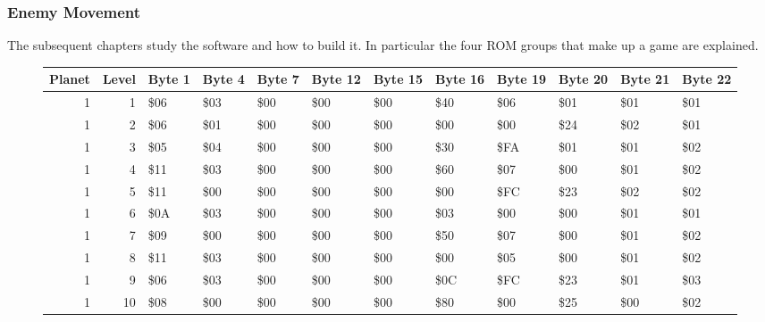 {\subsubsection{Enemy Movement}
The subsequent chapters study the software and how to build it. In particular the four ROM groups that make up a game are explained. 
\begin{figure}[H]
{ 
\setlength{\tabcolsep}{3.0pt}
\setlength\cmidrulewidth{\heavyrulewidth} %
\begin{adjustbox}{width=\textwidth}
\begin{tabular}{rrllllllllll}
\hline
   Planet &   Level & Byte 1    & Byte 4    & Byte 7    & Byte 12   & Byte 15   & Byte 16   & Byte 19   & Byte 20   & Byte 21   & Byte 22   \\
\hline
        1 &       1 & \$06       & \$03       & \$00       & \$00       & \$00       & \$40       & \$06       & \$01       & \$01       & \$01       \\
        1 &       2 & \$06       & \$01       & \$00       & \$00       & \$00       & \$00       & \$00       & \$24       & \$02       & \$01       \\
        1 &       3 & \$05       & \$04       & \$00       & \$00       & \$00       & \$30       & \$FA       & \$01       & \$01       & \$02       \\
        1 &       4 & \$11       & \$03       & \$00       & \$00       & \$00       & \$60       & \$07       & \$00       & \$01       & \$02       \\
        1 &       5 & \$11       & \$00       & \$00       & \$00       & \$00       & \$00       & \$FC       & \$23       & \$02       & \$02       \\
        1 &       6 & \$0A       & \$03       & \$00       & \$00       & \$00       & \$03       & \$00       & \$00       & \$01       & \$01       \\
        1 &       7 & \$09       & \$00       & \$00       & \$00       & \$00       & \$50       & \$07       & \$00       & \$01       & \$02       \\
        1 &       8 & \$11       & \$03       & \$00       & \$00       & \$00       & \$00       & \$05       & \$00       & \$01       & \$02       \\
        1 &       9 & \$06       & \$03       & \$00       & \$00       & \$00       & \$0C       & \$FC       & \$23       & \$01       & \$03       \\
        1 &      10 & \$08       & \$00       & \$00       & \$00       & \$00       & \$80       & \$00       & \$25       & \$00       & \$02       \\

\end{tabular}
\end{adjustbox}}
\end{figure}}
